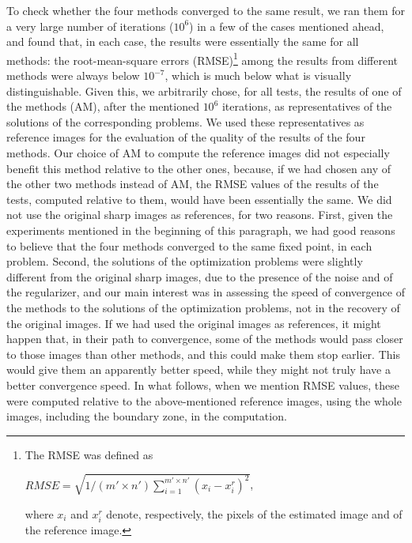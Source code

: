 \documentclass[10pt,twocolumn,twoside]{IEEEtran}
\begin{document}
To check whether the four methods converged to the same result, we ran them for a very large number of iterations ($10^6$) in a few of the cases mentioned ahead, and found that, in each case, the results were essentially the same for all methods: the root-mean-square errors (RMSE)\footnote{The RMSE was defined as

\vspace{.5mm}

{\centering $RMSE =  \sqrt{1 / (m' \times n')\sum_{i=1}^{m' \times n'} (x_i - x_i^r)^2}$, \par}

\noindent where $x_i$ and $x_i^r$ denote, respectively, the pixels of the estimated image and of the reference image.} among the results from different methods were always below $10^{-7}$, which is much below what is visually distinguishable. Given this, we arbitrarily chose, for all tests, the results of one of the methods (AM), after the mentioned $10^6$ iterations, as representatives of the solutions of the corresponding problems. We used these representatives as reference images for the evaluation of the quality of the results of the four methods. Our choice of AM to compute the reference images did not especially benefit this method relative to the other ones, because, if we had chosen any of the other two methods instead of AM, the RMSE values of the results of the tests, computed relative to them, would have been essentially the same. We did not use the original sharp images as references, for two reasons. First, given the experiments mentioned in the beginning of this paragraph, we had good reasons to believe that the four methods converged to the same fixed point, in each problem. Second, the solutions of the optimization problems were slightly different from the original sharp images, due to the presence of the noise and of the regularizer, and our main interest was in assessing the speed of convergence of the methods to the solutions of the optimization problems, not in the recovery of the original images. If we had used the original images as references, it might happen that, in their path to convergence, some of the methods would pass closer to those images than other methods, and this could make them stop earlier. This would give them an apparently better speed, while they might not truly have a better convergence speed. In what follows, when we mention RMSE values, these were computed relative to the above-mentioned reference images, using the whole images, including the boundary zone, in the computation.
\end{document}

